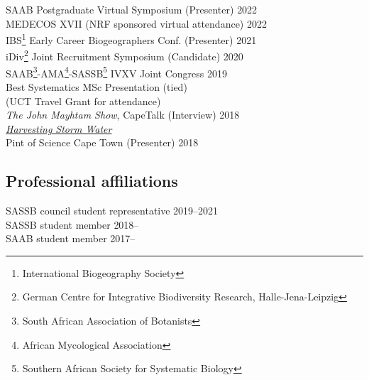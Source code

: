 \documentclass[10pt]{article}
\begin{document}
\begin{multicols}{2}
SAAB Postgraduate Virtual Symposium {\small (Presenter)}  \hfill {\small 2022} \\
MEDECOS XVII                        {\small (NRF sponsored virtual attendance)}
                                                          \hfill {\small 2022} \\
IBS\footnote{
    International Biogeography Society}
  Early Career Biogeographers Conf. {\small (Presenter)}  \hfill {\small 2021} \\
iDiv\footnote{
    German Centre for Integrative Biodiversity Research, Halle-Jena-Leipzig}
  Joint Recruitment Symposium       {\small (Candidate)}  \hfill {\small 2020} \\
SAAB\footnote{
    South African Association of Botanists}-AMA\footnote{
      African Mycological Association}-SASSB\footnote{
        Southern African Society for Systematic Biology}
  IVXV Joint Congress                                     \hfill {\small 2019} \\
  \hspace{2em} {\small Best Systematics MSc Presentation (tied)}               \\
  \hspace{2em} {\small (UCT Travel Grant for attendance)}                      \\
\textit{The John Mayhtam Show}, CapeTalk {\small (Interview)} \hfill {\small 2018} \\
  \hspace{2em} {\small \href{https://www.capetalk.co.za/articles/328900/harvesting-stormwater-from-liesbeek-river-may-aid-ct-water-supply-students-find}{\textit{Harvesting Storm Water}}} \\
Pint of Science Cape Town           {\small (Presenter)}  \hfill {\small 2018}

\subsection*{Professional affiliations} %

SASSB council student representative   \hfill {\small 2019--2021            } \\
SASSB student member                   \hfill {\small 2018--\hspace*{2.25em}} \\
SAAB student member                    \hfill {\small 2017--\hspace*{2.25em}}

\end{multicols} %
\end{document}
